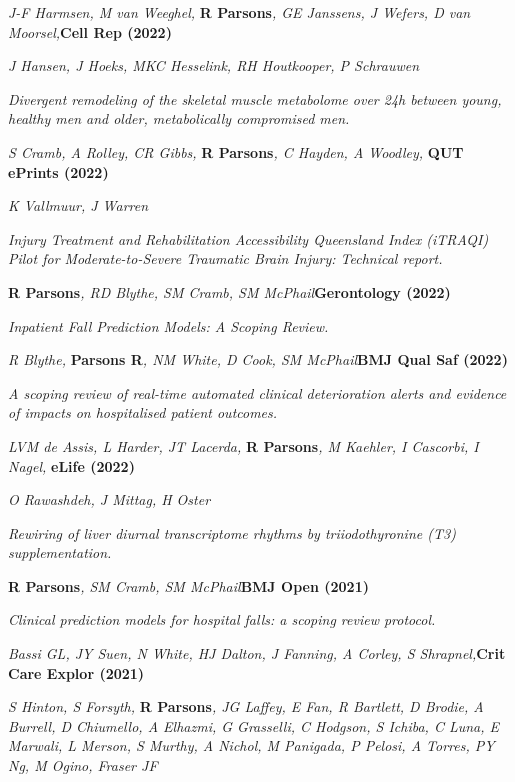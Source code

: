 \item
    \textit{J-F Harmsen, M van Weeghel, }\textbf{R Parsons}\textit{, GE Janssens, J Wefers, D van Moorsel,}\textbf{\hfill{Cell Rep (2022)}}\par
	\textit{J Hansen, J Hoeks, MKC Hesselink, RH Houtkooper, P Schrauwen}\par
    \textit{Divergent remodeling of the skeletal muscle metabolome over 24h between young, healthy men and older, metabolically compromised men.}
\item
    \textit{S Cramb, A Rolley, CR Gibbs, }\textbf{R Parsons}\textit{, C Hayden, A Woodley, }\textbf{\hfill{QUT ePrints (2022)}}\par
	\textit{K Vallmuur, J Warren}\par
	\textit{Injury Treatment and Rehabilitation Accessibility Queensland Index (iTRAQI) Pilot for Moderate-to-Severe Traumatic Brain Injury: Technical report.}
\item
    \textbf{R Parsons}\textit{, RD Blythe, SM Cramb, SM McPhail}\textbf{\hfill Gerontology (2022)}\par
	\textit{Inpatient Fall Prediction Models: A Scoping Review.}
\item
	\textit{R Blythe, }\textbf{Parsons R}\textit{, NM White, D Cook, SM McPhail}\textbf{\hfill{BMJ Qual Saf (2022)}}\par
	\textit{A scoping review of real-time automated clinical deterioration alerts and evidence of impacts on hospitalised patient outcomes.}
\item
	\textit{LVM de Assis, L Harder, JT Lacerda, }\textbf{R Parsons}\textit{, M Kaehler, I Cascorbi, I Nagel, }\textbf{\hfill eLife (2022)}\par
	\textit{O Rawashdeh, J Mittag, H Oster}\par
    \textit{Rewiring of liver diurnal transcriptome rhythms by triiodothyronine (T3) supplementation.}
\item
    \textbf{R Parsons}\textit{, SM Cramb, SM McPhail}\textbf{\hfill BMJ Open (2021)}\par 
    \textit{Clinical prediction models for hospital falls: a scoping review protocol.}
\item
    \textit{Bassi GL, JY Suen, N White, HJ Dalton, J Fanning, A Corley, S Shrapnel,}\textbf{\hfill Crit Care Explor (2021)}\par
	\textit{S Hinton, S Forsyth, }\textbf{R Parsons}\textit{, JG Laffey, E Fan, R Bartlett, D Brodie, A Burrell, D Chiumello, A Elhazmi, G Grasselli, C Hodgson, S Ichiba, C Luna, E Marwali, L Merson, S Murthy, A Nichol, M Panigada, P Pelosi, A Torres, PY Ng, M Ogino, Fraser JF}\par
